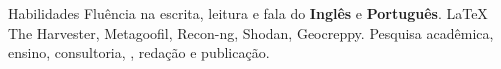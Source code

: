 
\begin{rubric}{Habilidades}
\entry*[Línguas]
	Fluência na escrita, leitura e fala do \textbf{Inglês} e \textbf{Português}.
	\LaTeX
\entry*[Osint]
	The Harvester, Metagoofil, Recon-ng, Shodan, Geocreppy.
\entry*[Outros]
	Pesquisa acadêmica, ensino, consultoria, \LaTex, redação e publicação.
\end{rubric}
